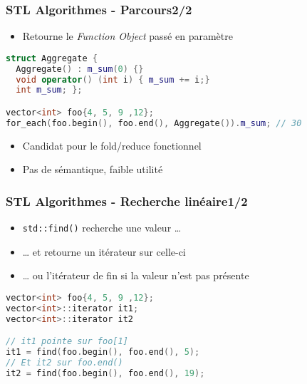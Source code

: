 \documentclass[C++.tex]{subfiles}
\begin{document}
\begin{frame}[fragile]
	\frametitle{STL Algorithmes - Parcours\titlehfill{}2/2}
	\begin{itemize}
		\item Retourne le \textit{Function Object} passé en paramètre
	\end{itemize}

	\begin{lstlisting}[language=C++]
struct Aggregate {
  Aggregate() : m_sum(0) {}
  void operator() (int i) { m_sum += i;}
  int m_sum; };

vector<int> foo{4, 5, 9 ,12};
for_each(foo.begin(), foo.end(), Aggregate()).m_sum; // 30\end{lstlisting}

	\begin{itemize}
		\item Candidat pour le fold/reduce fonctionnel
		\item Pas de sémantique, faible utilité

	\end{itemize}
\end{frame}

\begin{frame}[fragile]
	\frametitle{STL Algorithmes - Recherche linéaire\titlehfill{}1/2}
	\begin{itemize}
		\item \lstinline|std::find()| recherche une valeur \ldots
		\item \ldots{} et retourne un itérateur sur celle-ci
		\item \ldots{} ou l'itérateur de fin si la valeur n'est pas présente
	\end{itemize}

	\begin{lstlisting}[language=C++]
vector<int> foo{4, 5, 9 ,12};
vector<int>::iterator it1;
vector<int>::iterator it2

// it1 pointe sur foo[1]
it1 = find(foo.begin(), foo.end(), 5);
// Et it2 sur foo.end()
it2 = find(foo.begin(), foo.end(), 19);\end{lstlisting}
\end{frame}
\end{document}

